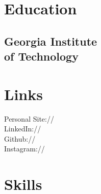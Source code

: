 \documentclass[]{deedy-resume-openfont}
\begin{document}
%
%
\lastupdated

%
%



%
%

\begin{minipage}[t]{0.33\textwidth} 


\section{Education} 

\subsection{Georgia Institute \\ of Technology}
\sectionsep


\section{Links} 
Personal Site://  \href{www.albertoli.tech}{} \\
LinkedIn://  \href{https://www.linkedin.com/in/alberto-li-127410b9/}{} \\
Github:// \href{https://www.github.com/albertoli}{} \\
Instagram://  \href{https://www.instagram.com/dumb_ytpos/}{}
\sectionsep


\section{Skills}

\end{minipage}
\end{document}
